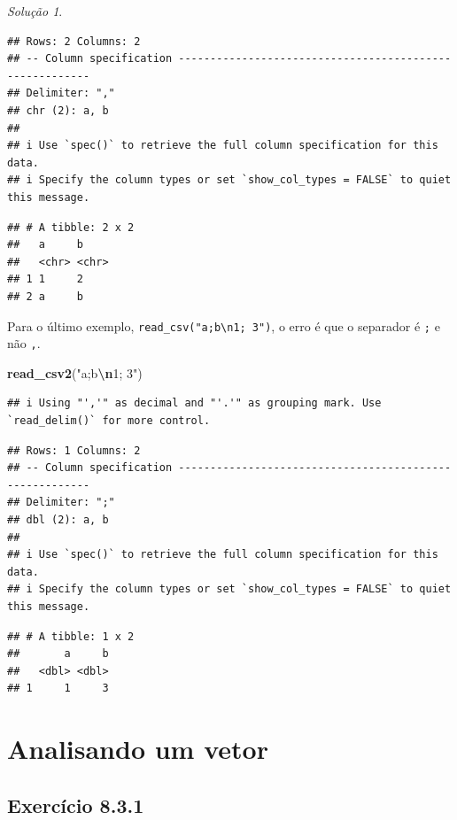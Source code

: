 \documentclass[
]{latex/krantz}
\newenvironment{Shaded}{\begin{snugshade}}{\end{snugshade}}
\newcommand{\FunctionTok}[1]{\textcolor[rgb]{0.13,0.29,0.53}{\textbf{#1}}}
\newcommand{\NormalTok}[1]{#1}
\newcommand{\SpecialCharTok}[1]{\textcolor[rgb]{0.81,0.36,0.00}{\textbf{#1}}}
\newcommand{\StringTok}[1]{\textcolor[rgb]{0.31,0.60,0.02}{#1}}
\theoremstyle{definition}
\theoremstyle{definition}
\theoremstyle{definition}
\theoremstyle{definition}
\theoremstyle{remark}
\newtheorem*{solution}{Solução}
\begin{document}
\begin{solution}
\begin{verbatim}
## Rows: 2 Columns: 2
## -- Column specification --------------------------------------------------------
## Delimiter: ","
## chr (2): a, b
## 
## i Use `spec()` to retrieve the full column specification for this data.
## i Specify the column types or set `show_col_types = FALSE` to quiet this message.
\end{verbatim}

\begin{verbatim}
## # A tibble: 2 x 2
##   a     b    
##   <chr> <chr>
## 1 1     2    
## 2 a     b
\end{verbatim}

Para o último exemplo, \texttt{read\_csv("a;b\textbackslash{}n1;\ 3")}, o erro é que o separador é \texttt{;} e não \texttt{,}.

\begin{Shaded}
\begin{Highlighting}[]
\FunctionTok{read\_csv2}\NormalTok{(}\StringTok{"a;b}\SpecialCharTok{\textbackslash{}n}\StringTok{1; 3"}\NormalTok{)}
\end{Highlighting}
\end{Shaded}

\begin{verbatim}
## i Using "','" as decimal and "'.'" as grouping mark. Use `read_delim()` for more control.
\end{verbatim}

\begin{verbatim}
## Rows: 1 Columns: 2
## -- Column specification --------------------------------------------------------
## Delimiter: ";"
## dbl (2): a, b
## 
## i Use `spec()` to retrieve the full column specification for this data.
## i Specify the column types or set `show_col_types = FALSE` to quiet this message.
\end{verbatim}

\begin{verbatim}
## # A tibble: 1 x 2
##       a     b
##   <dbl> <dbl>
## 1     1     3
\end{verbatim}

\end{solution}

\hypertarget{analisando-um-vetor}{%
\section{Analisando um vetor}\label{analisando-um-vetor}}

\hypertarget{exr8-3-1}{%
\subsection*{Exercício 8.3.1}\label{exr8-3-1}}
\end{document}

